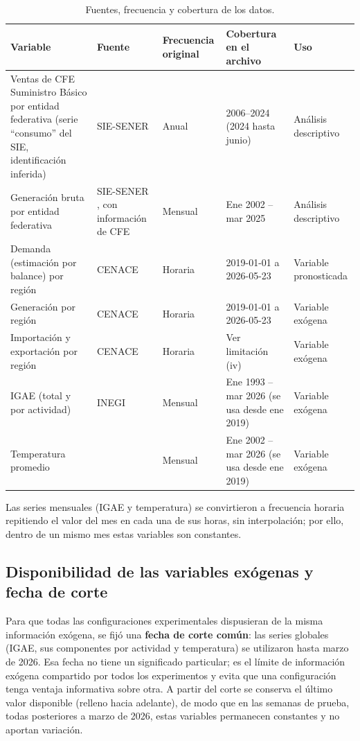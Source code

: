 \begin{table}[H]
\centering
\caption{Fuentes, frecuencia y cobertura de los datos.}
\label{tab:fuentes}
\small
\begin{tabular}{p{3.4cm}p{3.1cm}p{1.8cm}p{3.7cm}p{2.4cm}}
\hline
\textbf{Variable} & \textbf{Fuente} & \textbf{Frecuencia original} & \textbf{Cobertura en el archivo} & \textbf{Uso} \\
\hline
Ventas de CFE Suministro Básico por entidad federativa (serie ``consumo'' del SIE, identificación inferida) & SIE-SENER \cite{SIE} & Anual & 2006--2024 (2024 hasta junio) & Análisis descriptivo \\
Generación bruta por entidad federativa & SIE-SENER \cite{SIE}, con información de CFE & Mensual & Ene 2002 -- mar 2025 & Análisis descriptivo \\
Demanda (estimación por balance) por región & CENACE \cite{CENACE_DemandaReal} & Horaria & 2019-01-01 a 2026-05-23 & Variable pronosticada \\
Generación por región & CENACE \cite{CENACE_DemandaReal} & Horaria & 2019-01-01 a 2026-05-23 & Variable exógena \\
Importación y exportación por región & CENACE \cite{CENACE_DemandaReal} & Horaria & Ver limitación (iv) & Variable exógena \\
IGAE (total y por actividad) & INEGI \cite{INEGI_IGAE} & Mensual & Ene 1993 -- mar 2026 (se usa desde ene 2019) & Variable exógena \\
Temperatura promedio & \cite{TEMPERATURA} & Mensual & Ene 2002 -- mar 2026 (se usa desde ene 2019) & Variable exógena \\
\hline
\end{tabular}
\end{table}

Las series mensuales (IGAE y temperatura) se convirtieron a frecuencia horaria repitiendo el valor del mes en cada una de sus horas, sin interpolación; por ello, dentro de un mismo mes estas variables son constantes.

\subsection{Disponibilidad de las variables exógenas y fecha de corte}

Para que todas las configuraciones experimentales dispusieran de la misma información exógena, se fijó una \textbf{fecha de corte común}: las series globales (IGAE, sus componentes por actividad y temperatura) se utilizaron hasta marzo de 2026. Esa fecha no tiene un significado particular; es el límite de información exógena compartido por todos los experimentos y evita que una configuración tenga ventaja informativa sobre otra. A partir del corte se conserva el último valor disponible (relleno hacia adelante), de modo que en las semanas de prueba, todas posteriores a marzo de 2026, estas variables permanecen constantes y no aportan variación.

